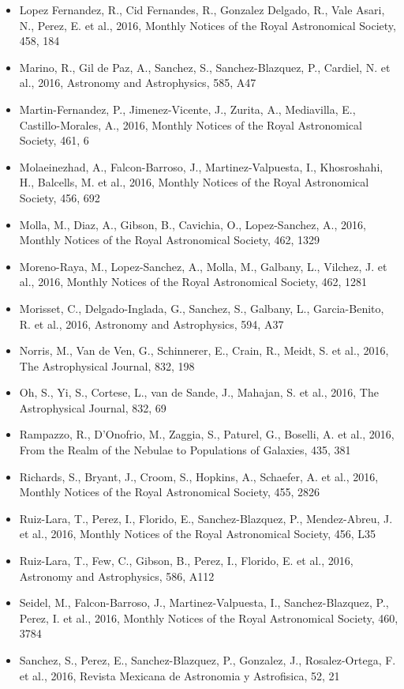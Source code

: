 \documentclass{letter}
\begin{document}
\begin{enumerate}
\begin{itemize}
\item Lopez Fernandez, R., Cid Fernandes, R., Gonzalez Delgado, R., Vale Asari, N., Perez, E. et al., 2016, Monthly Notices of the Royal Astronomical Society, 458, 184
\item Marino, R., Gil de Paz, A., Sanchez, S., Sanchez-Blazquez, P., Cardiel, N. et al., 2016, Astronomy and Astrophysics, 585, A47
\item Martin-Fernandez, P., Jimenez-Vicente, J., Zurita, A., Mediavilla, E., Castillo-Morales, A., 2016, Monthly Notices of the Royal Astronomical Society, 461, 6
\item Molaeinezhad, A., Falcon-Barroso, J., Martinez-Valpuesta, I., Khosroshahi, H., Balcells, M. et al., 2016, Monthly Notices of the Royal Astronomical Society, 456, 692
\item Molla, M., Diaz, A., Gibson, B., Cavichia, O., Lopez-Sanchez, A., 2016, Monthly Notices of the Royal Astronomical Society, 462, 1329
\item Moreno-Raya, M., Lopez-Sanchez, A., Molla, M., Galbany, L., Vilchez, J. et al., 2016, Monthly Notices of the Royal Astronomical Society, 462, 1281
\item Morisset, C., Delgado-Inglada, G., Sanchez, S., Galbany, L., Garcia-Benito, R. et al., 2016, Astronomy and Astrophysics, 594, A37
\item Norris, M., Van de Ven, G., Schinnerer, E., Crain, R., Meidt, S. et al., 2016, The Astrophysical Journal, 832, 198
\item Oh, S., Yi, S., Cortese, L., van de Sande, J., Mahajan, S. et al., 2016, The Astrophysical Journal, 832, 69
\item Rampazzo, R., D'Onofrio, M., Zaggia, S., Paturel, G., Boselli, A. et al., 2016, From the Realm of the Nebulae to Populations of Galaxies, 435, 381
\item Richards, S., Bryant, J., Croom, S., Hopkins, A., Schaefer, A. et al., 2016, Monthly Notices of the Royal Astronomical Society, 455, 2826
\item Ruiz-Lara, T., Perez, I., Florido, E., Sanchez-Blazquez, P., Mendez-Abreu, J. et al., 2016, Monthly Notices of the Royal Astronomical Society, 456, L35
\item Ruiz-Lara, T., Few, C., Gibson, B., Perez, I., Florido, E. et al., 2016, Astronomy and Astrophysics, 586, A112
\item Seidel, M., Falcon-Barroso, J., Martinez-Valpuesta, I., Sanchez-Blazquez, P., Perez, I. et al., 2016, Monthly Notices of the Royal Astronomical Society, 460, 3784
\item Sanchez, S., Perez, E., Sanchez-Blazquez, P., Gonzalez, J., Rosalez-Ortega, F. et al., 2016, Revista Mexicana de Astronomia y Astrofisica, 52, 21

\end{itemize}
\end{enumerate}
\end{document}
